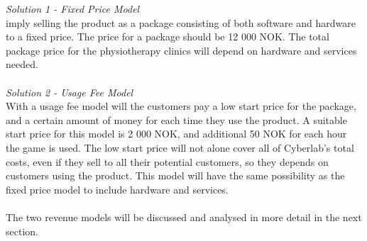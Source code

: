 \emph{Solution 1 - Fixed Price Model}\\  
imply selling the product as a package consisting of both software and hardware to a fixed price. The price for a package should be 12 000 NOK. The total package price for the physiotherapy clinics will depend on hardware and services needed. \\ \\
\emph{Solution 2 - Usage Fee Model}\\
With a usage fee model will the customers pay a low start price for the package, and a certain amount of money for each time they use the product. A suitable start price for this model is 2 000 NOK, and additional 50 NOK for each hour the game is used. The low start price will not alone cover all of Cyberlab's total costs, even if they sell to all their potential customers, so they depends on customers using the product. This model will have the same possibility as the fixed price model to include hardware and services. \\ \\
The two revenue models will be discussed and analysed in more detail in the next section.

